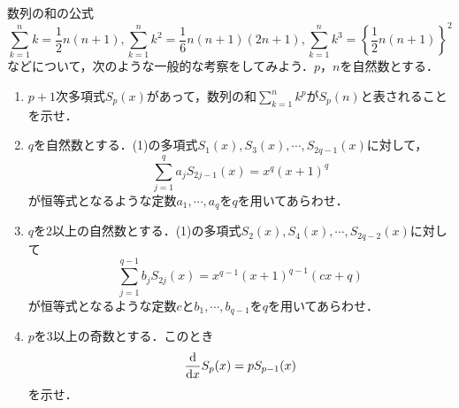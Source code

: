 \documentclass[../../main.tex]{subfiles}
\begin{document}
数列の和の公式
\begin{equation}
  \sum_{k=1}^{n}k=\dfrac{1}{2}n(n+1),  \sum_{k=1}^{n}k^2=\dfrac{1}{6}n(n+1)(2n+1), \sum_{k=1}^{n}k^3=\left\{\dfrac{1}{2}n(n+1)\right\}^2
\end{equation}
などについて，次のような一般的な考察をしてみよう．$p$，$n$を自然数とする．

\begin{enumerate}
  \item $p+1$次多項式$S_p(x)$があって，数列の和$\sum_{k=1}^{n}k^p$が$S_p(n)$と表されることを示せ．
  \item $q$を自然数とする．(1)の多項式$S_1(x), S_3(x),\cdots,S_{2q-1}(x)$に対して，
    \begin{equation}
      \sum_{j=1}^{q}a_{j}S_{2j-1}(x)=x^q(x+1)^q
    \end{equation}
    が恒等式となるような定数$a_1,\cdots,a_q$を$q$を用いてあらわせ．
  \item $q$を$2$以上の自然数とする．(1)の多項式$S_2(x),S_4(x),\cdots,S_{2q-2}(x)$に対して
    \begin{equation}
      \sum_{j=1}^{q-1}b_{j}S_{2j}(x)=x^{q-1}(x+1)^{q-1}(cx+q)
    \end{equation}
    が恒等式となるような定数$c$と$b_1,\cdots,b_{q-1}$を$q$を用いてあらわせ．
  \item $p$を$3$以上の奇数とする．このとき
    \begin{equation}
      \dv{x}S_{p}(x)=pS_{p-1}(x)
    \end{equation}
    を示せ．
\end{enumerate}
\end{document}
